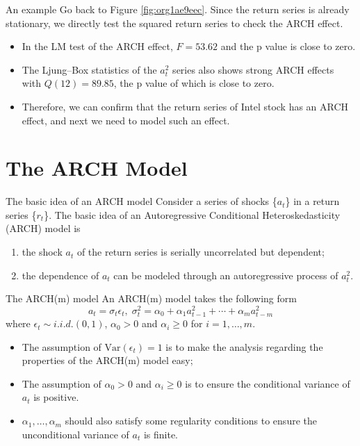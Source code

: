 \documentclass[presentation,10pt]{beamer}
\newcommand{\var}{\mathrm{Var}}
\begin{document}
\begin{frame}[label={sec:orgb442462}]{An example}
Go back to Figure \ref{fig:org1ae9eec}. Since the return series is
already stationary, we directly test the squared return series to
check the ARCH effect. 

\begin{itemize}
\item In the LM test of the ARCH effect, \(F = 53.62\) and the p value is
close to zero.
\item The Ljung–Box statistics of the \(a^2_t\) series also
shows strong ARCH effects with \(Q(12) = 89.85\), the p value of which is
close to zero.
\item Therefore, we can confirm that the return series of
Intel stock has an ARCH effect, and next we need to model such an
effect.
\end{itemize}
\end{frame}

\section{The ARCH Model}
\label{sec:orge4a36ec}

\begin{frame}[label={sec:orgd40109c}]{The basic idea of an ARCH model}
Consider a series of shocks \{\(a_t\)\} in a return series \{\(r_t\)\}. The
basic idea of an Autoregressive Conditional Heteroskedasticity (ARCH)
model is

\begin{enumerate}
\item the shock \(a_t\) of the return series is serially uncorrelated but
dependent;

\item the dependence of \(a_t\) can be modeled through an autoregressive
process of \(a^2_t\).
\end{enumerate}
\end{frame}

\begin{frame}[label={sec:orgb9cfd4d}]{The ARCH(m) model}
An ARCH(m) model takes the following form
\begin{equation}
\label{eq:archm}
a_t = \sigma_t \epsilon_t,\; \sigma^2_t = \alpha_0 + \alpha_1 a^2_{t-1} + \cdots + \alpha_m a^2_{t-m}
\end{equation}
where \(\epsilon_t \sim i.i.d.(0, 1)\), \(\alpha_0 > 0\) and \(\alpha_i
\geq 0\) for \(i=1, \ldots, m\). 

\begin{itemize}
\item The assumption of \(\var(\epsilon_t)=1\) is to make the analysis
regarding the properties of the ARCH(m) model easy;
\item The assumption of \(\alpha_0 > 0\) and \(\alpha_i \geq 0\) is to ensure
the conditional variance of \(a_t\) is positive.
\item \(\alpha_1, \ldots, \alpha_m\) should also satisfy some regularity
conditions to ensure the unconditional variance of \(a_t\) is finite.
\end{itemize}
\end{frame}
\end{document}
